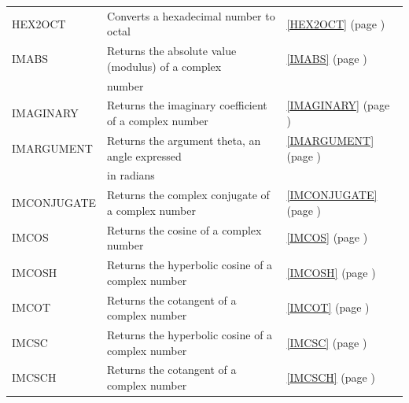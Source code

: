 \begin{center}
\begin{longtable}{l l l }
		HEX2OCT & Converts a hexadecimal number to octal &  \ref{HEX2OCT} (page \pageref{HEX2OCT}) \index{Spreadsheet Functions!HEX2OCT} \\
		IMABS & Returns the absolute value (modulus) of a complex &  \ref{IMABS} (page \pageref{IMABS}) \index{Spreadsheet Functions!IMABS} \\
		& number &   \\
		IMAGINARY & Returns the imaginary coefficient of a complex number &  \ref{IMAGINARY} (page \pageref{IMAGINARY}) \index{Spreadsheet Functions!IMAGINARY} \\
		IMARGUMENT & Returns the argument theta, an angle expressed &  \ref{IMARGUMENT} (page \pageref{IMARGUMENT}) \index{Spreadsheet Functions!IMARGUMENT} \\
		& in radians &   \\
		IMCONJUGATE & Returns the complex conjugate of a complex number &  \ref{IMCONJUGATE} (page \pageref{IMCONJUGATE}) \index{Spreadsheet Functions!IMCONJUGATE} \\
		IMCOS & Returns the cosine of a complex number &  \ref{IMCOS} (page \pageref{IMCOS}) \index{Spreadsheet Functions!IMCOS} \\
		
		IMCOSH & Returns the hyperbolic cosine of a complex number &  \ref{IMCOSH} (page \pageref{IMCOSH}) \index{Spreadsheet Functions!IMCOSH} \\
		IMCOT & Returns the cotangent of a complex number &  \ref{IMCOT} (page \pageref{IMCOT}) \index{Spreadsheet Functions!IMCOT} \\
		
		IMCSC & Returns the hyperbolic cosine of a complex number &  \ref{IMCSC} (page \pageref{IMCSC}) \index{Spreadsheet Functions!IMCSC} \\
		IMCSCH & Returns the cotangent of a complex number &  \ref{IMCSCH} (page \pageref{IMCSCH}) \index{Spreadsheet Functions!IMCSCH} \\
		

\end{longtable}
\end{center}
